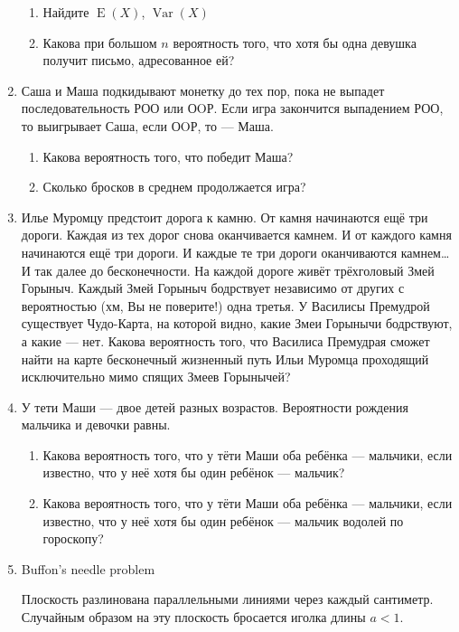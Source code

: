 \documentclass{tufte-handout}
\DeclareMathOperator{\Var}{Var}
\DeclareMathOperator{\E}{E}
\begin{document}
\begin{enumerate}
\begin{enumerate}
\item Найдите $\E(X)$, $\Var(X)$
\item Какова при большом $n$ вероятность того, что хотя бы одна девушка получит письмо, адресованное ей?
\end{enumerate}



\item Саша и Маша подкидывают монетку до тех пор, пока не выпадет
последовательность РОО или ОOР. Если игра закончится выпадением
РОО, то выигрывает Саша, если ОOР, то --- Маша. 
\begin{enumerate}
\item Какова вероятность того, что победит Маша?
\item Сколько бросков в среднем продолжается игра?
\end{enumerate}

\item Илье Муромцу предстоит дорога к камню. От камня начинаются ещё три дороги. Каждая из тех дорог снова оканчивается камнем. И от каждого камня начинаются ещё три дороги. И каждые те три дороги оканчиваются камнем\ldots И так далее до бесконечности. На каждой дороге живёт трёхголовый Змей Горыныч. Каждый Змей Горыныч бодрствует независимо от других с вероятностью (хм, Вы не поверите!) одна третья. У Василисы Премудрой существует Чудо-Карта, на которой видно, какие Змеи Горынычи бодрствуют, а какие --- нет. Какова вероятность того, что Василиса Премудрая сможет найти на карте  бесконечный жизненный путь Ильи Муромца проходящий исключительно мимо спящих Змеев Горынычей?

\item У тети Маши --- двое детей разных возрастов. Вероятности рождения мальчика и девочки равны. 
\begin{enumerate}
\item Какова вероятность того, что у тёти Маши оба ребёнка --- мальчики, если известно, что у неё хотя бы один ребёнок --- мальчик?
\item Какова вероятность того, что у тёти Маши оба ребёнка --- мальчики, если известно, что у неё хотя бы один ребёнок --- мальчик водолей по гороскопу?
\end{enumerate}

\item Buffon's needle problem

Плоскость разлинована параллельными линиями через каждый сантиметр. Случайным образом на эту плоскость бросается иголка длины $a<1$. 


\end{enumerate}
\end{document}
